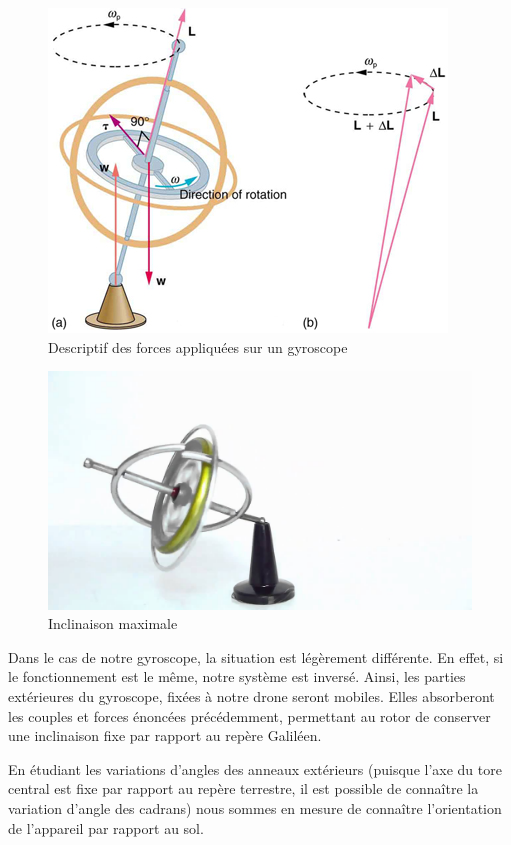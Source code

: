 \documentclass[a4paper,10pt]{report}
\begin{document}
	  \begin{figure}[htbp]
	    \centering
	    \includegraphics[scale = 1.3]{img/schema_gyro.png}
	    \caption{Descriptif des forces appliquées sur un gyroscope}
	    \label{descriptifforces}
	  \end{figure}
	  
	  \begin{figure}[htbp]
	    \centering
	    \includegraphics[scale = 0.2]{img/inclinaison.jpg}
	    \caption{Inclinaison maximale}
	    \label{inclinaisonmax}
	  \end{figure}
	  
	  Dans le cas de notre gyroscope, la situation est légèrement 
différente. En effet, si le fonctionnement est le même, notre système est 
inversé. Ainsi, les parties extérieures du gyroscope, fixées à notre drone 
seront mobiles. Elles absorberont les couples et forces énoncées précédemment, 
permettant au rotor de conserver une inclinaison fixe par rapport au repère 
Galiléen.

	  En étudiant les variations d'angles des anneaux extérieurs (puisque 
l'axe du tore central est fixe par rapport au repère terrestre, il est possible 
de connaître la variation d'angle des cadrans) nous sommes en mesure de 
connaître l'orientation de l'appareil par rapport au sol.
\end{document}
